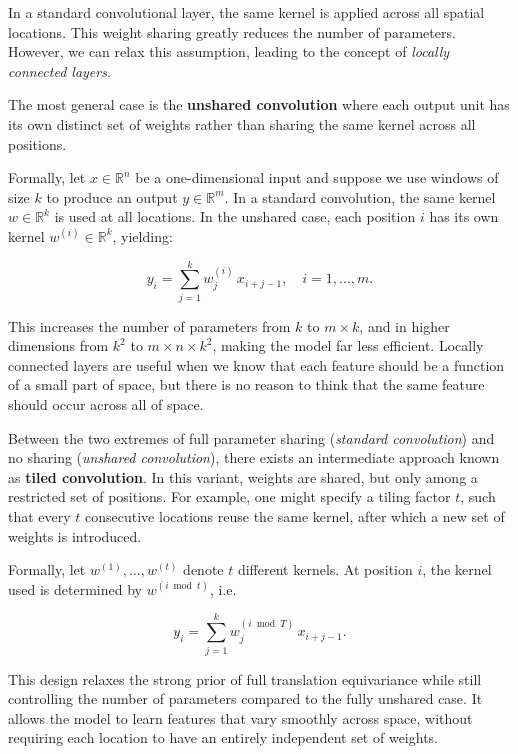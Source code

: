 In a standard convolutional layer, the same kernel is applied across all spatial locations. This weight sharing greatly reduces the number of parameters.  
However, we can relax this assumption, leading to the concept of \textit{locally connected layers}.  

The most general case is the \textbf{unshared convolution} where each output unit has its own distinct set of weights rather than sharing the same kernel across all positions.

\clearpage

Formally, let $x \in \mathbb{R}^{n}$ be a one-dimensional input and suppose we use windows of size $k$ to produce an output $y \in \mathbb{R}^{m}$.  
In a standard convolution, the same kernel $w \in \mathbb{R}^{k}$ is used at all locations. In the unshared case, each position $i$ has its own kernel $w^{(i)} \in \mathbb{R}^{k}$, yielding:

\begin{equation}
y_i = \sum_{j=1}^{k} w^{(i)}_j \, x_{i+j-1}, \quad i=1,\dots,m.
\end{equation}

This increases the number of parameters from $k$ to $m \times k$, and in higher dimensions from $k^2$ to $m \times n \times k^2$, making the model far less efficient.  
Locally connected layers are useful when we know that each feature should be a function of a small part of space, but there is no reason to think that the same feature should occur across all of space. 

Between the two extremes of full parameter sharing (\textit{standard convolution}) and no sharing (\textit{unshared convolution}), there exists an intermediate approach known as \textbf{tiled convolution}.  
In this variant, weights are shared, but only among a restricted set of positions.  
For example, one might specify a tiling factor $t$, such that every $t$ consecutive locations reuse the same kernel, after which a new set of weights is introduced.  

Formally, let $w^{(1)}, \dots, w^{(t)}$ denote $t$ different kernels.  
At position $i$, the kernel used is determined by $w^{(i \bmod t)}$, i.e.

\begin{equation}
y_i = \sum_{j=1}^{k} w^{(i \bmod T)}_j \, x_{i+j-1}.
\end{equation}

This design relaxes the strong prior of full translation equivariance while still controlling the number of parameters compared to the fully unshared case.  
It allows the model to learn features that vary smoothly across space, without requiring each location to have an entirely independent set of weights.  

